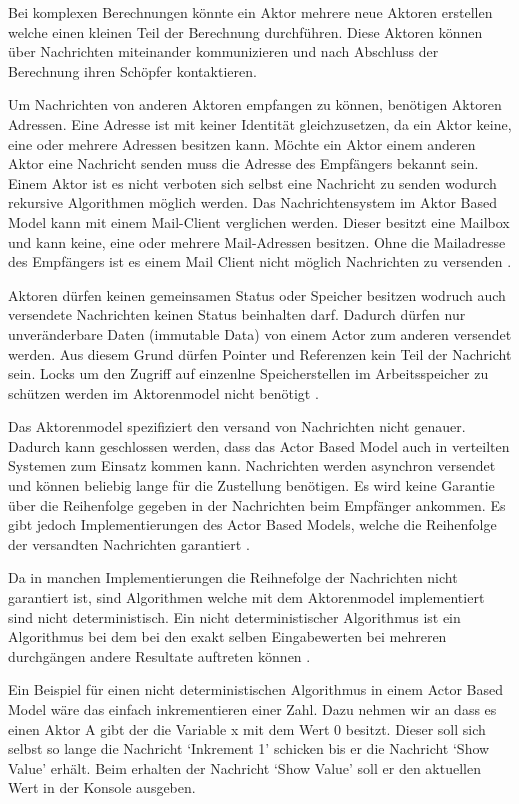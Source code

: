 Bei komplexen Berechnungen könnte ein Aktor mehrere neue Aktoren erstellen welche einen kleinen Teil der Berechnung durchführen. Diese Aktoren können über Nachrichten miteinander kommunizieren und nach Abschluss der Berechnung ihren Schöpfer kontaktieren. 

Um Nachrichten von anderen Aktoren empfangen zu können, benötigen Aktoren Adressen. Eine Adresse ist mit keiner Identität gleichzusetzen, da ein Aktor keine, eine oder mehrere Adressen besitzen kann. Möchte ein Aktor einem anderen Aktor eine Nachricht senden muss die Adresse des Empfängers bekannt sein. Einem Aktor ist es nicht verboten sich selbst eine Nachricht zu senden wodurch rekursive Algorithmen möglich werden. Das Nachrichtensystem im Aktor Based Model kann mit einem Mail-Client verglichen werden. Dieser besitzt eine Mailbox und kann keine, eine oder mehrere Mail-Adressen besitzen. Ohne die Mailadresse des Empfängers ist es einem Mail Client nicht möglich Nachrichten zu versenden \cite[p. 85]{Erb2012}. 

Aktoren dürfen keinen gemeinsamen Status oder Speicher besitzen wodruch auch versendete Nachrichten keinen Status beinhalten darf. Dadurch dürfen nur unveränderbare Daten (immutable Data) von einem Actor zum anderen versendet werden. Aus diesem Grund dürfen Pointer und Referenzen kein Teil der Nachricht sein. Locks um den Zugriff auf einzenlne Speicherstellen im Arbeitsspeicher zu schützen werden im Aktorenmodel nicht benötigt \cite[p. 85]{Erb2012}.

Das Aktorenmodel spezifiziert den versand von Nachrichten nicht genauer. Dadurch kann geschlossen werden, dass das Actor Based Model auch in verteilten Systemen zum Einsatz kommen kann. Nachrichten werden asynchron versendet und können beliebig lange für die Zustellung benötigen. Es wird keine Garantie über die Reihenfolge gegeben in der Nachrichten beim Empfänger ankommen. Es gibt jedoch Implementierungen des Actor Based Models, welche die Reihenfolge der versandten Nachrichten garantiert \cite[p. 85]{Erb2012}.

Da in manchen Implementierungen die Reihnefolge der Nachrichten nicht garantiert ist, sind Algorithmen welche mit dem Aktorenmodel implementiert sind nicht deterministisch. Ein nicht deterministischer Algorithmus ist ein Algorithmus bei dem bei den exakt selben Eingabewerten bei mehreren durchgängen andere Resultate auftreten können \cite[]{Agh85}. 

Ein Beispiel für einen nicht deterministischen Algorithmus in einem Actor Based Model wäre das einfach inkrementieren einer Zahl. Dazu nehmen wir an dass es einen Aktor A gibt der die Variable x mit dem Wert 0 besitzt. Dieser soll sich selbst so lange die Nachricht `Inkrement 1' schicken bis er die Nachricht `Show Value' erhält. Beim erhalten der Nachricht `Show Value' soll er den aktuellen Wert in der Konsole ausgeben.

